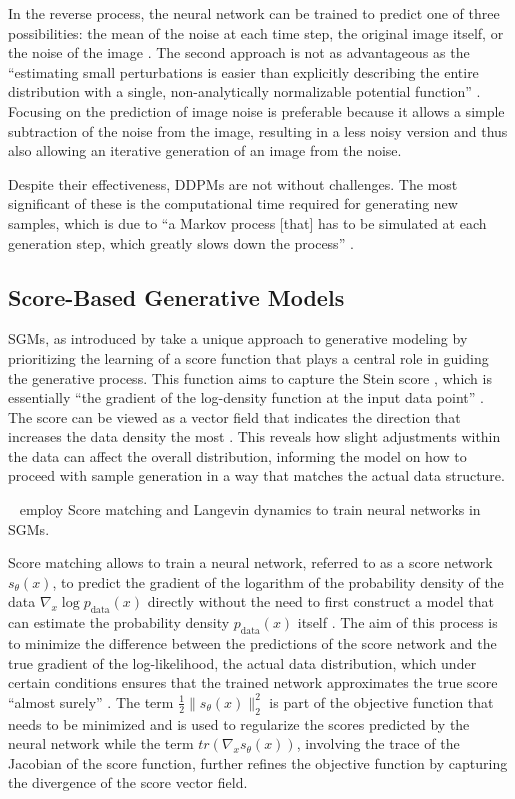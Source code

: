 In the reverse process, the neural network can be trained to predict one of three possibilities: the mean of the noise at each time step, the original image itself, or the noise of the image \citep{hoDDPMs}. The second approach is not as advantageous as the ``estimating small perturbations is easier than explicitly describing the entire distribution with a single, non-analytically normalizable potential function'' \citep{sohlDDPM}. Focusing on the prediction of image noise is preferable because it allows a simple subtraction of the noise from the image, resulting in a less noisy version and thus also allowing an iterative generation of an image from the noise.

Despite their effectiveness, DDPMs are not without challenges. The most significant of these is the computational time required for generating new samples, which is due to ``a Markov process [that] has to be simulated at each generation step, which greatly slows down the process'' \citep{martinez2023understanding}.


\subsection{Score-Based Generative Models}

SGMs, as introduced by \citeauthor{song2019SGM} take a unique approach to generative modeling by prioritizing the learning of a score function that plays a central role in guiding the generative process. This function aims to capture the Stein score \citep{steinScore}, which is essentially ``the gradient of the log-density function at the input data point'' \citep{song2019SGM}. The score can be viewed as a vector field that indicates the direction that increases the data density the most \citep{song2019SGM}. This reveals how slight adjustments within the data can affect the overall distribution, informing the model on how to proceed with sample generation in a way that matches the actual data structure.

~\citeauthor{song2019SGM} employ Score matching and Langevin dynamics \citep{hyvarinenScoreMatching} to train neural networks in SGMs.


Score matching allows to train a neural network, referred to as a score network \( s_\theta(x) \), to predict the gradient of the logarithm of the probability density of the data \( \nabla_x \log p_{\text{data}}(x) \) directly without the need to first construct a model that can estimate the probability density \( p_{\text{data}}(x) \) itself \citep{song2019SGM}. The aim of this process is to minimize the difference between the predictions of the score network and the true gradient of the log-likelihood, the actual data distribution,  which under certain conditions ensures that the trained network approximates the true score ``almost surely'' \citep{song2019SGM}. The term \( \frac{1}{2} \|s_\theta(x)\|^2_2 \) is part of the objective function that needs to be minimized and is used to regularize the scores predicted by the neural network while the term \( tr(\nabla_x s_\theta(x)) \), involving the trace of the Jacobian \citep{song2019SGM} of the score function, further refines the objective function by capturing the divergence of the score vector field. 

